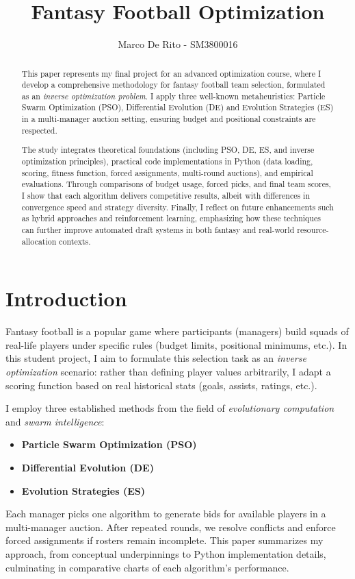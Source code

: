 \documentclass[sigconf]{acmart}
\title{Fantasy Football Optimization}
\author{Marco De Rito - SM3800016}
\affiliation{
	\institution{University of Trieste}
	\city{Trieste}
	\country{Italy}
}
\begin{document}
\sloppy
	\begin{abstract}
This paper represents my final project for an advanced optimization course, where I develop a comprehensive methodology for fantasy football team selection, formulated as an \emph{inverse optimization problem}. I apply three well-known metaheuristics: Particle Swarm Optimization (PSO), Differential Evolution (DE) and Evolution Strategies (ES) in a multi-manager auction setting, ensuring budget and positional constraints are respected.

The study integrates theoretical foundations (including PSO, DE, ES, and inverse optimization principles), practical code implementations in Python (data loading, scoring, fitness function, forced assignments, multi-round auctions), and empirical evaluations. Through comparisons of budget usage, forced picks, and final team scores, I show that each algorithm delivers competitive results, albeit with differences in convergence speed and strategy diversity. Finally, I reflect on future enhancements such as hybrid approaches and reinforcement learning, emphasizing how these techniques can further improve automated draft systems in both fantasy and real-world resource-allocation contexts.
	\end{abstract}
	
	
\maketitle
	
	\section{Introduction}
	Fantasy football is a popular game where participants (managers) build squads of real-life players under specific rules (budget limits, positional minimums, etc.). In this student project, I aim to formulate this selection task as an \emph{inverse optimization} scenario: rather than defining player values arbitrarily, I adapt a scoring function based on real historical stats (goals, assists, ratings, etc.).
	
	I employ three established methods from the field of \emph{evolutionary computation} and \emph{swarm intelligence}:
	\begin{itemize}
\item \textbf{Particle Swarm Optimization (PSO)}
\item \textbf{Differential Evolution (DE)}
\item \textbf{Evolution Strategies (ES)}
	\end{itemize}
	Each manager picks one algorithm to generate bids for available players in a multi-manager auction. After repeated rounds, we resolve conflicts and enforce forced assignments if rosters remain incomplete. This paper summarizes my approach, from conceptual underpinnings to Python implementation details, culminating in comparative charts of each algorithm’s performance.
	
\end{document}
